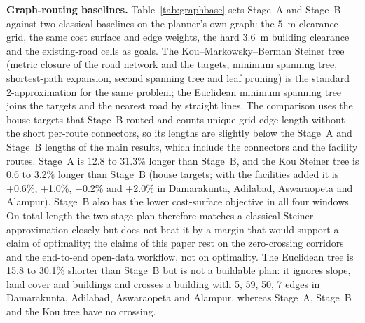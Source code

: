 \documentclass[preprint,12pt]{elsarticle}
\begin{document}
\textbf{Graph-routing baselines.} Table~\ref{tab:graphbase} sets Stage~A and Stage~B against two classical baselines on the planner's own graph: the $5$~m clearance grid, the same cost surface and edge weights, the hard $3.6$~m building clearance and the existing-road cells as goals. The Kou--Markowsky--Berman Steiner tree \cite{kou1981steiner} (metric closure of the road network and the targets, minimum spanning tree, shortest-path expansion, second spanning tree and leaf pruning) is the standard 2-approximation for the same problem; the Euclidean minimum spanning tree joins the targets and the nearest road by straight lines. The comparison uses the house targets that Stage~B routed and counts unique grid-edge length without the short per-route connectors, so its lengths are slightly below the Stage~A and Stage~B lengths of the main results, which include the connectors and the facility routes. Stage~A is 12.8 to 31.3\% longer than Stage~B, and the Kou Steiner tree is 0.6 to 3.2\% longer than Stage~B (house targets; with the facilities added it is +0.6\%, +1.0\%, $-$0.2\% and +2.0\% in Damarakunta, Adilabad, Aswaraopeta and Alampur). Stage~B also has the lower cost-surface objective in all four windows. On total length the two-stage plan therefore matches a classical Steiner approximation closely but does not beat it by a margin that would support a claim of optimality; the claims of this paper rest on the zero-crossing corridors and the end-to-end open-data workflow, not on optimality. The Euclidean tree is 15.8 to 30.1\% shorter than Stage~B but is not a buildable plan: it ignores slope, land cover and buildings and crosses a building with 5, 59, 50, 7 edges in Damarakunta, Adilabad, Aswaraopeta and Alampur, whereas Stage~A, Stage~B and the Kou tree have no crossing.
\end{document}
